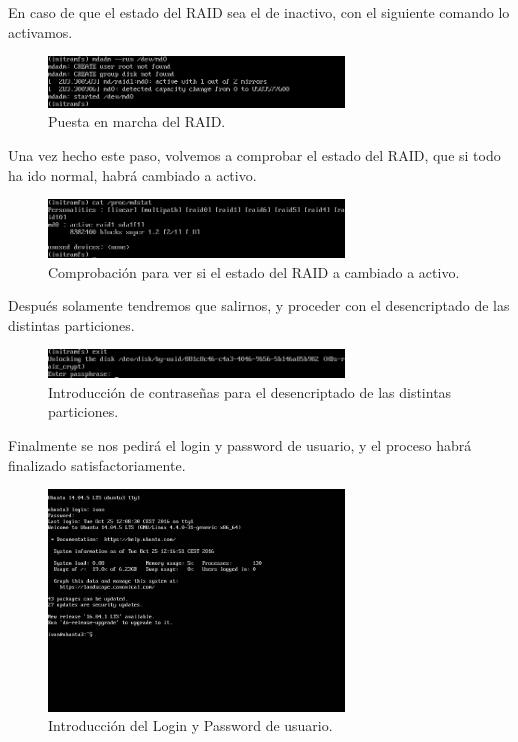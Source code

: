 En caso de que el estado del RAID sea el de inactivo, con el siguiente comando lo activamos. \cite{MDADMMAN}
\begin{figure}[H]
	\begin{center}		
		\includegraphics[width=0.7\textwidth]{Imagenes/06_Activando_Particion_2}
		\caption{Puesta en marcha del RAID.} \label{fig:figura6}
	\end{center}
\end{figure}
Una vez hecho este paso, volvemos a comprobar el estado del RAID, que si todo ha ido normal, habrá cambiado a activo.
\begin{figure}[H]
	\begin{center}		
		\includegraphics[width=0.7\textwidth]{Imagenes/07_Visualizando_Actividad_raid}
		\caption{Comprobación para ver si el estado del RAID a cambiado a activo.} \label{fig:figura7}
	\end{center}
\end{figure}
Después solamente tendremos que salirnos, y proceder con el desencriptado de las distintas particiones.
\begin{figure}[H]
	\begin{center}		
		\includegraphics[width=0.7\textwidth]{Imagenes/08_Saliendo_initramfs}
		\caption{Introducción de contraseñas para el desencriptado de las distintas particiones.} \label{fig:figura8}
	\end{center}
\end{figure}
Finalmente se nos pedirá el login y password de usuario, y el proceso habrá finalizado satisfactoriamente.
\begin{figure}[H]
	\begin{center}		
		\includegraphics[width=0.7\textwidth]{Imagenes/09_Estado_Final}
		\caption{Introducción del Login y Password de usuario.} \label{fig:figura9}
	\end{center}
\end{figure}

